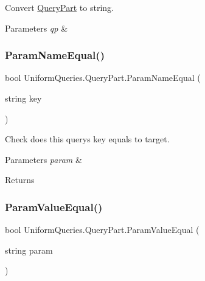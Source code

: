 Convert \mbox{\hyperlink{struct_uniform_queries_1_1_query_part}{Query\+Part}} to string. 


\begin{DoxyParams}{Parameters}
{\em qp} & \\
\hline
\end{DoxyParams}
\mbox{\label{struct_uniform_queries_1_1_query_part_af032469107805c1c71083666bb8548a9}} 
\subsubsection{\texorpdfstring{Param\+Name\+Equal()}{ParamNameEqual()}}
{\footnotesize\ttfamily bool Uniform\+Queries.\+Query\+Part.\+Param\+Name\+Equal (\begin{DoxyParamCaption}\item[{string}]{key }\end{DoxyParamCaption})}



Check does this query\textquotesingle{}s key equals to target. 


\begin{DoxyParams}{Parameters}
{\em param} & \\
\hline
\end{DoxyParams}
\begin{DoxyReturn}{Returns}

\end{DoxyReturn}
\mbox{\label{struct_uniform_queries_1_1_query_part_a5fb4475a72dcb6882fc860f7c0fcc50e}} 
\subsubsection{\texorpdfstring{Param\+Value\+Equal()}{ParamValueEqual()}}
{\footnotesize\ttfamily bool Uniform\+Queries.\+Query\+Part.\+Param\+Value\+Equal (\begin{DoxyParamCaption}\item[{string}]{param }\end{DoxyParamCaption})}



